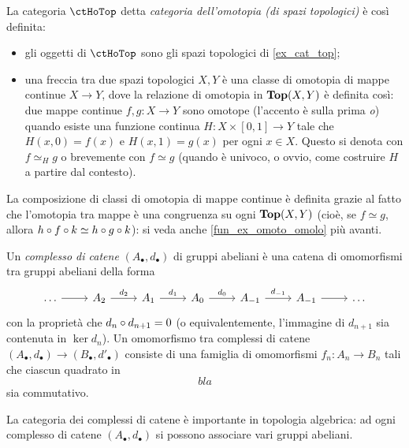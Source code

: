 \begin{example}\label{ex_cat_hotop}
	La categoria $\ctHoTop$ detta \emph{categoria dell'omotopia (di spazi topologici)} è così definita:  
	\begin{itemize}
		\item gli oggetti di $\ctHoTop$ sono gli spazi topologici di \ref{ex_cat_top};
		\item una freccia tra due spazi topologici $X,Y$ è una classe di omotopia di mappe continue $X\to Y$, dove la relazione di omotopia in $\mathbf{Top}(X,Y)$ è definita così: due mappe continue $f,g : X\to Y$ sono omotope (l'accento è sulla prima \emph{o}) quando esiste una funzione continua $H : X \times [0,1] \to Y$ tale che $H(x,0) = f(x)$ e $H(x,1)=g(x)$ per ogni $x\in X$. Questo si denota con $f\simeq_H g$ o brevemente con $f\simeq g$ (quando è univoco, o ovvio, come costruire $H$ a partire dal contesto).
	\end{itemize}
	La composizione di classi di omotopia di mappe continue è definita grazie al fatto che l'omotopia tra mappe è una congruenza su ogni $\mathbf{Top}(X,Y)$ (cioè, se $f\simeq g$, allora $h\circ f\circ k\simeq h\circ g\circ k$): si veda anche \ref{fun_ex_omoto_omolo} più avanti.
\end{example}
\begin{example}
	Un \emph{complesso di catene} $(A_\bullet, d_\bullet)$ di gruppi abeliani è una catena di omomorfismi tra gruppi abeliani della forma 
	\[\begin{tikzcd}
		\dots \ar[r] & A_2 \ar[r, "d_2"] & A_1  \ar[r, "d_1"] & A_0 \ar[r, "d_0"] & A_{-1} \ar[r, "d_{-1}"] & A_{-1} \ar[r] & \dots
	\end{tikzcd}\]
	con la proprietà che $d_n\circ d_{n+1}=0$ (o equivalentemente, l'immagine di $d_{n+1}$ sia contenuta in $\ker d_n$). Un omomorfismo tra complessi di catene $(A_\bullet,d_\bullet) \to (B_\bullet,d'_\bullet)$ consiste di una famiglia di omomorfismi $f_n : A_n \to B_n$ tali che ciascun quadrato in 
	\[bla\]
	sia commutativo.

	La categoria dei complessi di catene è importante in topologia algebrica: ad ogni complesso di catene $(A_\bullet, d_\bullet)$ si possono associare vari gruppi abeliani.
\end{example}
